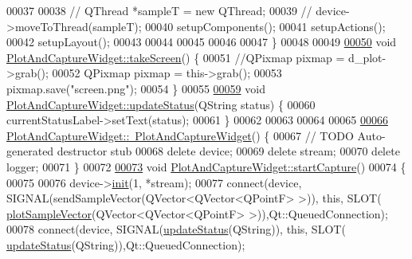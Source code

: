 \begin{DoxyCode}
00037 
00038       \textcolor{comment}{//         QThread *sampleT = new QThread;}
00039       \textcolor{comment}{//         device->moveToThread(sampleT);}
00040                 setupComponents();
00041                 setupActions();
00042                 setupLayout();
00043 
00044 
00045 
00046 
00047 \}
00048 
00049 
\hypertarget{plotandcapturewidget_8cpp_source.tex_l00050}{}\hyperlink{classPlotAndCaptureWidget_a77ecf5a130215ce0246b8817e44081f7}{00050} \textcolor{keywordtype}{void} \hyperlink{classPlotAndCaptureWidget_a77ecf5a130215ce0246b8817e44081f7}{PlotAndCaptureWidget::takeScreen}() \{
00051     \textcolor{comment}{//QPixmap pixmap = d\_plot->grab();}
00052     QPixmap pixmap = this->grab();
00053     pixmap.save(\textcolor{stringliteral}{"screen.png"});
00054 \}
00055 
\hypertarget{plotandcapturewidget_8cpp_source.tex_l00059}{}\hyperlink{classPlotAndCaptureWidget_a769ecd243154ae9c4ecae9bd4fcbccdb}{00059} \textcolor{keywordtype}{void} \hyperlink{classPlotAndCaptureWidget_a769ecd243154ae9c4ecae9bd4fcbccdb}{PlotAndCaptureWidget::updateStatus}(QString status) \{
00060     currentStatusLabel->setText(status);
00061 \}
00062 
00063 
00064 
00065 
\hypertarget{plotandcapturewidget_8cpp_source.tex_l00066}{}\hyperlink{classPlotAndCaptureWidget_a04d11f3f4d553c39b0d99da1a9ec0a11}{00066} \hyperlink{classPlotAndCaptureWidget_a04d11f3f4d553c39b0d99da1a9ec0a11}{PlotAndCaptureWidget::~PlotAndCaptureWidget}() \{
00067     \textcolor{comment}{// TODO Auto-generated destructor stub}
00068     \textcolor{keyword}{delete} device;
00069     \textcolor{keyword}{delete} stream;
00070     \textcolor{keyword}{delete} logger;
00071 \}
00072 
\hypertarget{plotandcapturewidget_8cpp_source.tex_l00073}{}\hyperlink{classPlotAndCaptureWidget_a232d01f00a25365382f094ad8eedb7fa}{00073} \textcolor{keywordtype}{void} \hyperlink{classPlotAndCaptureWidget_a232d01f00a25365382f094ad8eedb7fa}{PlotAndCaptureWidget::startCapture}()
00074 \{
00075 
00076         device->\hyperlink{classDeviceManager_a280116304655de3a0bbfbf49730f9384}{init}(1, *stream);
00077         connect(device, SIGNAL(sendSampleVector(QVector<QVector<QPointF> >)), \textcolor{keyword}{this}, SLOT(
      \hyperlink{classPlotAndCaptureWidget_a7dca31208a65906f0a96bf4143e0da4f}{plotSampleVector}(QVector<QVector<QPointF> >)),Qt::QueuedConnection);
00078         connect(device, SIGNAL(\hyperlink{classPlotAndCaptureWidget_a769ecd243154ae9c4ecae9bd4fcbccdb}{updateStatus}(QString)), \textcolor{keyword}{this}, SLOT(
      \hyperlink{classPlotAndCaptureWidget_a769ecd243154ae9c4ecae9bd4fcbccdb}{updateStatus}(QString)),Qt::QueuedConnection);

\end{DoxyCode}

